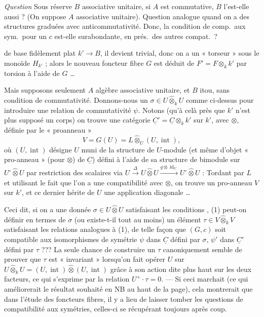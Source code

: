 \documentclass[11pt,a4paper]{article}
\begin{document}
\emph{Question} Sous réserve $B$ associative unitaire, si $A$ est commutative,
$B$ l'est-elle aussi ? (On suppose $A$ associative unitaire). Question analogue
quand on a des structures graduées avec anticommutativité. Donc, la condition de
comp.\ aux sym.\ pour un $c$ est-elle surabondante, en prés.\ des
autres compat.\ ?

de base fidèlement plat $k' \to B$, \struck{\ill{}} il devient trivial, donc on
a un « torseur » sous le monoïde $H_{k'}$ ; alors le nouveau foncteur fibre $G$
est déduit de $F' = F \otimes_{k} k'$ par torsion à l'aide de $G$ …

Mais supposons seulement $A$ algèbre associative unitaire, et $B$ itou, sans
condition de commutativité.  Donnons-nous un
$\sigma \in U \mathbin{\widehat{\otimes}}_{k} U$ \struck{\ill{}} comme
ci-dessus pour introduire une relation de commutativité $\psi$. Notons (qu'à
celà près que $k'$ n'est plus supposé un corps) on trouve une catégorie
$\underline{C}' = \underline{C} \otimes_{k} k'$ sur $k'$, avec $\otimes$,
définie par le « proanneau »
\[ V = G(U) = L \mathbin{\widehat{\otimes}}_{U} (U,\operatorname{int}) , \]
où $(U,\operatorname{int})$ désigne $U$ muni de la structure de $U$-module
\struck{\ill{}} (et même d'objet « pro-anneau » (pour $\otimes$) de
$\underline{C}$) défini à l'aide de sa structure de bimodule sur
$U^{\circ} \mathbin{\widehat{\otimes}} U$ \struck{\ill{}} par restriction des
scalaires via
$U \xrightarrow{\Delta} U \mathbin{\widehat{\otimes}} U
\xrightarrow{g \otimes \operatorname{id}_{U}}
U^{\circ} \mathbin{\widehat{\otimes}} U$ : Tordant par $L$ et utilisant le fait
que l'on a une compatibilité avec $\otimes$, on trouve un pro-anneau $V$ sur
$k'$, et ce dernier hérite de $U$ une application diagonale …

Ceci dit, si on a une donnée
$\sigma \in U \mathbin{\widehat{\otimes}} U$ satisfaisant les conditions
, (1) peut-on définir en termes de $\sigma$ (ou existe-t-il tout
au moins) un élément $\tau \in V \mathbin{\widehat{\otimes}}_{k} V$ satisfaisant
les relations analogues à (1), de telle façon que $(G,c)$ soit compatible aux
isomorphismes de symétrie $\psi$ dans $\underline{C}$ défini par $\sigma$,
$\psi'$ dans $\underline{C}'$ défini par $\tau$ ??? La seule chance de
 construire un $\tau$ canoniquement semble de prouver que
$\tau$ est « invariant » lorsqu'on fait opérer $U$ sur
$U \mathbin{\widehat{\otimes}}_{k} U = (U,\operatorname{int})
\mathbin{\widehat{\otimes}} (U,\operatorname{int})$ grâce à son \struck{\ill{}}
action dite plus haut sur les deux facteurs, ce qui s'exprime par la relation
$U^{+}\!\cdot\tau = 0$. ---
Si ceci marchait (ce qui améliorerait le résultat souhaité en NB au haut de la
page), cela montrerait que dans l'étude des foncteurs fibres, il y a lieu de
laisser tomber les questions de compatibilité aux symétries, celles-ci se
récupérant toujours après coup.
\end{document}

